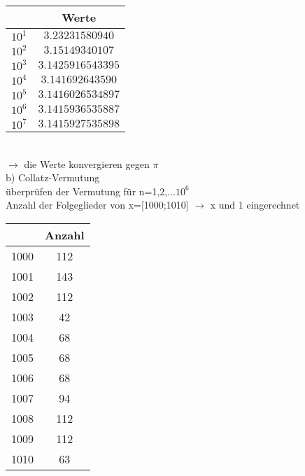\documentclass[paper=a4, fontsize=11pt]{scrartcl}
\numberwithin{equation}{section}
\numberwithin{figure}{section}
\numberwithin{table}{section}
\begin{document}
 \begin{tabular}{|c|c|}
  \hline
    & Werte \\ 
   \hline
   $10^{1}$ & $3.23231580940$\\ 
   \hline
   $10^{2}$ & $3.15149340107$\\ 
   \hline
   $10^{3}$ & $3.1425916543395$\\ 
   \hline
   $10^{4}$ & $3.141692643590$\\ 
   \hline
   $10^{5}$ & $3.1416026534897$\\ 
   \hline
   $10^{6}$ &$ 3.1415936535887$\\ 
   \hline
   $10^{7}$ & $3.1415927535898$\\ 
   \hline 
 \end{tabular}
 \\
 
$\rightarrow$ die Werte konvergieren gegen $\pi$ \\

b) Collatz-Vermutung\\
überprüfen der Vermutung für n=1,2,...$10^{6}$ \\

Anzahl der Folgeglieder von x=[1000;1010] $\rightarrow$ x und 1 eingerechnet\\

\begin{tabular}{|c|c|}
  \hline
    & Anzahl \\ 
   \hline
   1000 & 112\\ 
   \hline
   1001 & 143\\ 
   \hline
   1002 & 112\\ 
   \hline
   1003 & 42\\ 
   \hline
   1004 & 68\\ 
   \hline
   1005 & 68\\ 
   \hline
   1006 & 68\\ 
   \hline
   1007 & 94\\ 
   \hline
   1008 & 112\\ 
   \hline
   1009 & 112\\ 
   \hline
   1010 & 63\\ 
   \hline 
\end{tabular}
\\
 
\end{document}
